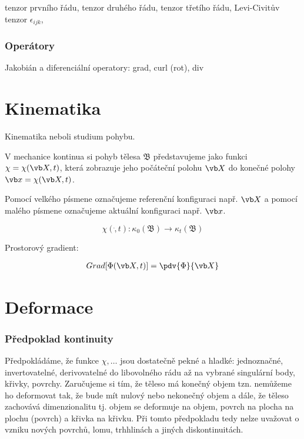 tenzor prvního řádu, tenzor druhého řádu, tenzor třetího řádu, Levi-Civitův tenzor $\epsilon_{ijk}$, 

\subsection{Operátory}

Jakobián a diferenciální operatory: grad, curl (rot), div

\chapter{Kinematika}

Kinematika neboli studium pohybu.

V mechanice kontinua si pohyb tělesa $\mathfrak{B}$ představujeme jako funkci $\chi = \chi(\vb X, t)$, která zobrazuje jeho počáteční polohu $\vb X$ do konečné polohy $\vb x = \chi(\vb X, t)$.

Pomocí velkého písmene označujeme referenční konfiguraci např. $\vb X$ a pomocí malého písmene označujeme aktuální konfiguraci např. $\vb x$.

\begin{equation}
    \chi(\dot, t) : \kappa_0(\mathfrak{B}) \to \kappa_t(\mathfrak{B}) 
\end{equation}

Prostorový gradient:

\begin{gather}
    Grad[\Phi(\vb X, t)] = \pdv{\Phi}{\vb X} \\
\end{gather}

\chapter{Deformace}

\subsection{Předpoklad kontinuity}

Předpokládáme, že funkce $\chi, \ldots$ jsou dostatečně pekné a hladké: jednoznačné, invertovatelné, derivovatelné do libovolného rádu až na vybrané singulární body, křivky, povrchy. Zaručujeme si tím, že těleso má konečný objem tzn. nemůžeme ho deformovat tak, že bude mít nulový nebo nekonečný objem a dále, že těleso zachovává dimenzionalitu tj. objem se deformuje na objem, povrch na plocha na plochu (povrch) a křivka na křivku. Při tomto předpokladu tedy nelze uvažovat o vzniku nových povrchů, lomu, trhhlinách a jiných diskontinuitách.


